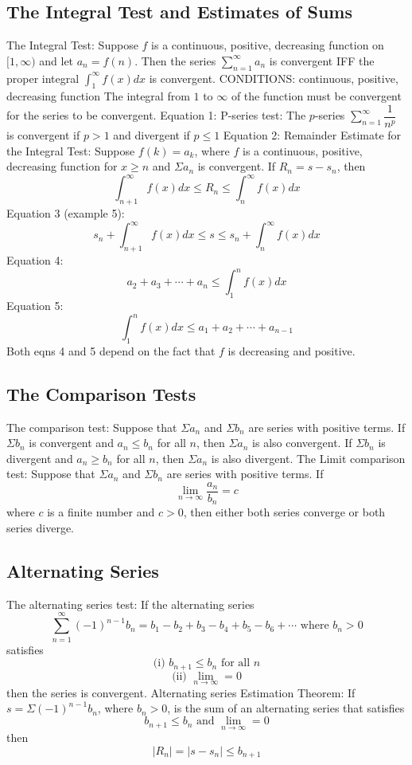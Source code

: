 \documentclass{article}
\begin{document}
    \subsection{The Integral Test and Estimates of Sums}
    \begin{outline}
        \1 The Integral Test: Suppose $f$ is a continuous, positive, decreasing function on \([1,\infty)\) and let \(a_n=f(n)\). Then the series \(\sum^\infty_{n=1}a_n\) is convergent IFF the proper integral \(\int^\infty_1f(x)dx\) is convergent. 
            \2 CONDITIONS: continuous, positive, decreasing function 
            \2 The integral from $1$ to $\infty$ of the function must be convergent for the series to be convergent. 
        \1 Equation 1: P-series test: The $p$-series \(\sum^\infty_{n=1}\dfrac{1}{n^p}\) is convergent if \(p>1\) and divergent if \(p\leq1\)
        \1 Equation 2: Remainder Estimate for the Integral Test: Suppose \(f(k)=a_k\), where $f$ is a continuous, positive, decreasing function for \(x\geq n\) and \(\Sigma a_n\) is convergent. If \(R_n=s-s_n\), then \[\int^\infty_{n+1}f(x)dx\leq R_n\leq\int^\infty_n f(x)dx\]
        \1 Equation 3 (example 5): \[s_n+\int^\infty_{n+1}f(x)dx\leq s\leq s_n+\int^\infty_nf(x)dx\]
        \1 Equation 4: \[a_2+a_3+\cdots+a_n\leq\int^n_1f(x)dx\]
        \1 Equation 5: \[\int^n_1f(x)dx\leq a_1+a_2+\cdots+a_{n-1}\]
            \2 Both eqns 4 and 5 depend on the fact that $f$ is decreasing and positive. 
    \end{outline}
    \subsection{The Comparison Tests}
    \begin{outline}
        \1 The comparison test: Suppose that \(\Sigma a_n\) and \(\Sigma b_n\) are series with positive terms. 
            \2 If \(\Sigma b_n\) is convergent and \(a_n\leq b_n\) for all $n$, then \(\Sigma a_n\) is also convergent. 
            \2 If \(\Sigma b_n\) is divergent and \(a_n\geq b_n\) for all $n$, then \(\Sigma a_n\) is also divergent. 
        \1 The Limit comparison test: Suppose that \(\Sigma a_n\) and \(\Sigma b_n\) are series with positive terms. If \[\lim_{n\to\infty}\dfrac{a_n}{b_n}=c\] where $c$ is a finite number and \(c>0\), then either both series converge or both series diverge. 

    \end{outline}
    \subsection{Alternating Series}
    \begin{outline}
        \1 The alternating series test: If the alternating series \[\sum^\infty_{n=1}(-1)^{n-1}b_n=b_1-b_2+b_3-b_4+b_5-b_6+\cdots \mbox{ where } b_n>0\] satisfies \[\mbox{(i) }b_{n+1}\leq b_n\mbox{ for all }n\]\[\mbox{(ii) }\lim_{n\to\infty}=0\] then the series is convergent. 
        \1 Alternating series Estimation Theorem: If \(s=\Sigma (-1)^{n-1}b_n\), where \(b_n>0\), is the sum of an alternating series that satisfies \[b_{n+1}\leq b_n\mbox{ and }\lim_{n\to\infty}=0\] then \[|R_n|=|s-s_n|\leq b_{n+1}\]
    \end{outline}
\end{document}
